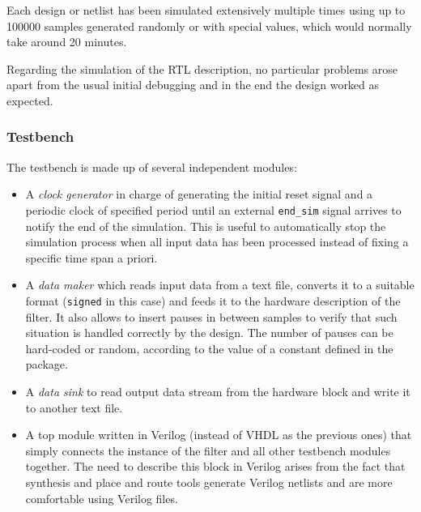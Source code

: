 \documentclass[a4paper]{article}
\begin{document}
Each design or netlist has been simulated extensively multiple times using up to 100000 samples generated randomly or with special values, which would normally take around 20 minutes.

Regarding the simulation of the RTL description, no particular problems arose apart from the usual initial debugging and in the end the design worked as expected.

\subsubsection{Testbench}
The testbench is made up of several independent modules:
\begin{itemize}
    \item A \emph{clock generator} in charge of generating the initial reset signal and a periodic clock of specified period until an external \texttt{end\_sim} signal arrives to notify the end of the simulation. This is useful to automatically stop the simulation process when all input data has been processed instead of fixing a specific time span a priori.
    \item A \emph{data maker} which reads input data from a text file, converts it to a suitable format (\texttt{signed} in this case) and feeds it to the hardware description of the filter. It also allows to insert pauses in between samples to verify that such situation is handled correctly by the design. The number of pauses can be hard-coded or random, according to the value of a constant defined in the package.
    \item A \emph{data sink} to read output data stream from the hardware block and write it to another text file.
    \item A top module written in Verilog (instead of VHDL as the previous ones) that simply connects the instance of the filter and all other testbench modules together. The need to describe this block in Verilog arises from the fact that synthesis and place and route tools generate Verilog netlists and are more comfortable using Verilog files.
\end{itemize}
\end{document}
